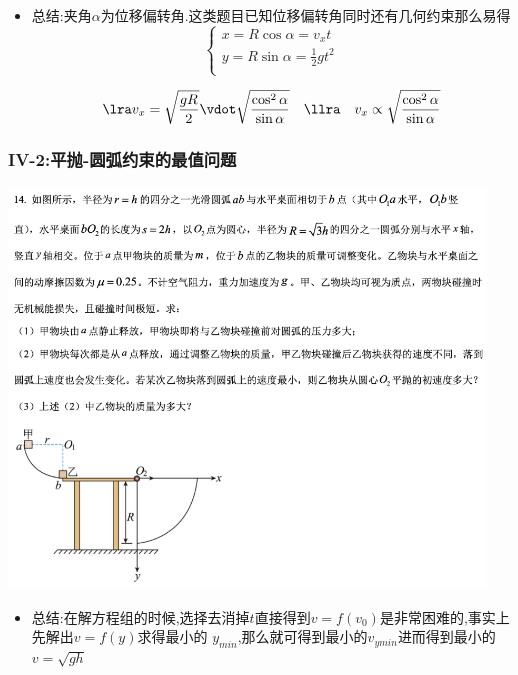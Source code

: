 \documentclass{article}
\begin{document}
\begin{itemize}
    \item 总结:夹角$\alpha$为位移偏转角.这类题目已知位移偏转角同时还有几何约束那么易得
          $$
              \begin{cases}
                  x = R \cos{\alpha} = v_{x} t             \\
                  y = R \sin{\alpha} = \frac{1}{2} g t^{2} \\
              \end{cases}
          $$

          $$
              \lra v_{x} = \sqrt{\frac{gR}{2}} \vdot \sqrt{\frac{\cos^{2}{\alpha}}{\sin{\alpha}}} \quad  \llra \quad  v_{x}  \propto  \sqrt{\frac{\cos^{2}{\alpha}}{\sin{\alpha}}}
          $$

\end{itemize}

\vspace{2em}

\subsubsection{IV-2:平抛-圆弧约束的最值问题}
\includegraphics[width=0.95\textwidth,keepaspectratio]{./pictures/1.2-6.png}


\begin{itemize}
    \item 总结:\quad 在解方程组的时候,选择去消掉$t$直接得到$v = f(v_{0})$是非常困难的,事实上先解出$v = f(y)$求得最小的
          $y_{min}$,那么就可得到最小的$v_{ymin}$进而得到最小的$v = \sqrt{gh}$
\end{itemize}
\end{document}
